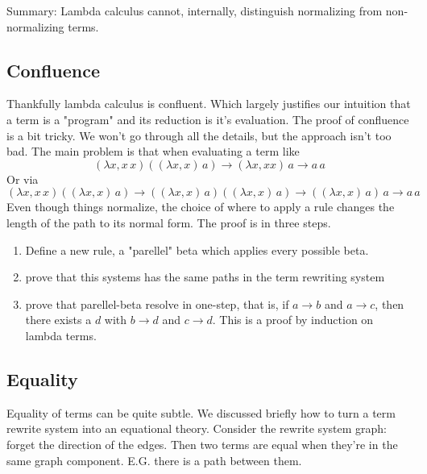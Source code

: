\documentclass[12pt]{article}
\begin{document}
Summary: Lambda calculus cannot, internally, distinguish normalizing from non-normalizing terms.

\subsection{Confluence}
Thankfully lambda calculus is confluent.
Which largely justifies our intuition that a term is a "program" and its reduction is it's evaluation.
The proof of confluence is a bit tricky.
We won't go through all the details, but the approach isn't too bad.
The main problem is that when evaluating a term like 
\[
  (\lambda x, x\, x) ((\lambda x, x)\, a) \rightarrow (\lambda x, x x)\, a \rightarrow a\,a
\]
Or via
\[
  (\lambda x, x\, x) ((\lambda x, x)\, a) \rightarrow ((\lambda x, x)\, a)((\lambda x, x)\, a) \rightarrow ((\lambda x, x)\, a)\,a \rightarrow a\, a
\]
Even though things normalize, the choice of where to apply a rule changes the length of the path to its normal form.
The proof is in three steps. 
\begin{enumerate}
    \item Define a new rule, a "parellel" beta which applies every possible beta.
    \item prove that this systems has the same paths in the term rewriting system
    \item prove that parellel-beta resolve in one-step, that is, if $a \rightarrow b$ and $a \rightarrow c$, then there exists a $d$ with $b \rightarrow d$ and $c \rightarrow d$. This is a proof by induction on lambda terms.
\end{enumerate}

\subsection{Equality}
Equality of terms can be quite subtle.
We discussed briefly how to turn a term rewrite system into an equational theory.
Consider the rewrite system graph: forget the direction of the edges. 
Then two terms are equal when they're in the same graph component.
E.G. there is a path between them.
\end{document}
